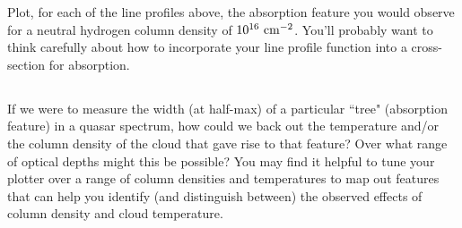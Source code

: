 \documentclass[11pt]{article}
\begin{document}
Plot, for each of the line profiles above, the absorption feature
you would observe for a neutral hydrogen column density of $10^{16}~{\rm cm}^{-2}$.  You'll probably
want to think carefully about how to incorporate your line profile function into a cross-section for
absorption.

\subsection{}
If we were to measure the width (at half-max) of a particular ``tree" (absorption feature) in a
quasar spectrum, how could we back out the temperature and/or the column density of the cloud that gave
rise to that feature?  Over what range of optical depths might this be possible?  You may find it helpful
to tune your plotter over a range of column densities and temperatures to map out features that can help
you identify (and distinguish between) the observed effects of column density and cloud temperature.
\end{document}
